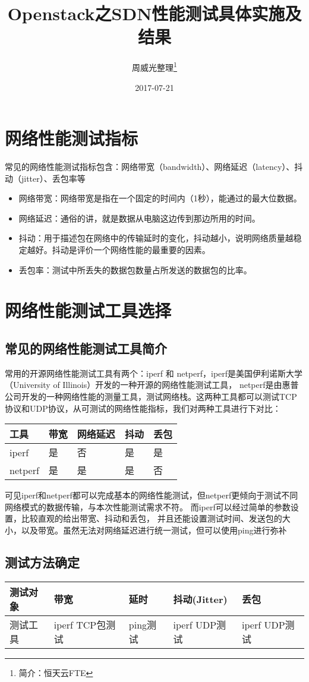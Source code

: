 \documentclass[a4paper,left=1.5cm,right=1.5cm,11pt]{article}
\title{Openstack之SDN性能测试具体实施及结果}
\author{周威光整理\footnote{简介：恒天云FTE}}
\date{2017-07-21}
\begin{document}
\maketitle
\clearpage
\tableofcontents
\clearpage
\section{网络性能测试指标}
常见的网络性能测试指标包含：网络带宽（bandwidth）、网络延迟（latency）、抖动（jitter）、丢包率等
\begin{itemize}
	\item[1.]网络带宽：网络带宽是指在一个固定的时间内（1秒），能通过的最大位数据。
	\item[2.]网络延迟：通俗的讲，就是数据从电脑这边传到那边所用的时间。
	\item[3.]抖动：用于描述包在网络中的传输延时的变化，抖动越小，说明网络质量越稳定越好。抖动是评价一个网络性能的最重要的因素。
	\item[4.]丢包率：测试中所丢失的数据包数量占所发送的数据包的比率。
\end{itemize}
\section{网络性能测试工具选择}
\subsection{常见的网络性能测试工具简介}
常用的开源网络性能测试工具有两个：iperf 和 netperf，iperf是美国伊利诺斯大学（University of Illinois）开发的一种开源的网络性能测试工具，
netperf是由惠普公司开发的一种网络性能的测量工具，测试网络栈。这两种工具都可以测试TCP协议和UDP协议，从可测试的网络性能指标，我们对两种工具进行下对比：
\begin{center}
\begin{tabular}[c]{|l|l|l|l|l|}
\hline
工具 & 带宽 & 网络延迟 & 抖动 & 丢包 \\
\hline
iperf & 是 & 否 & 是 & 是 \\
\hline
netperf & 是 & 是 & 是 & 否 \\
\hline
\end{tabular}
\end{center}\par
可见iperf和netperf都可以完成基本的网络性能测试，但netperf更倾向于测试不同网络模式的数据传输，与本次性能测试需求不符。
而iperf可以经过简单的参数设置，比较直观的给出带宽、抖动和丢包，
并且还能设置测试时间、发送包的大小，以及带宽。虽然无法对网络延迟进行统一测试，但可以使用ping进行弥补
\subsection{测试方法确定}
\begin{center}
\begin{tabular}[c]{|l|l|l|l|l|}
\hline
测试对象 & 带宽 & 延时 & 抖动(Jitter) & 丢包 \\
\hline
测试工具 & iperf TCP包测试 & ping测试 & iperf UDP测试 & iperf UDP测试 \\
\hline
\end{tabular}
\end{center}
\end{document}
